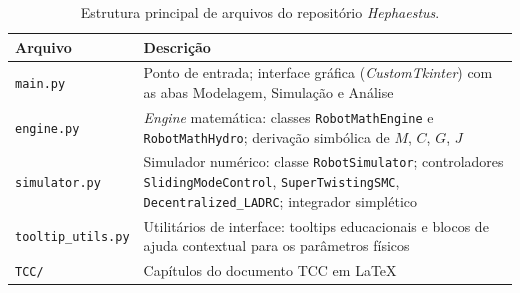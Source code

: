 \begin{table}[h!]
\centering
\caption{Estrutura principal de arquivos do repositório \textit{Hephaestus}.}
\label{tab:estrutura}
\begin{tabular}{l p{9.5cm}}
\hline
\textbf{Arquivo} & \textbf{Descrição} \\
\hline
\texttt{main.py}          & Ponto de entrada; interface gráfica (\textit{CustomTkinter}) com as abas Modelagem, Simulação e Análise \\
\texttt{engine.py}        & \textit{Engine} matemática: classes \texttt{RobotMathEngine} e \texttt{RobotMathHydro}; derivação simbólica de $M$, $C$, $G$, $J$ \\
\texttt{simulator.py}     & Simulador numérico: classe \texttt{RobotSimulator}; controladores \texttt{SlidingModeControl}, \texttt{SuperTwistingSMC}, \texttt{Decentralized\_LADRC}; integrador simplético \\
\texttt{tooltip\_utils.py} & Utilitários de interface: tooltips educacionais e blocos de ajuda contextual para os parâmetros físicos \\
\texttt{TCC/}             & Capítulos do documento TCC em \LaTeX{} \\
\hline
\end{tabular}
\end{table}

